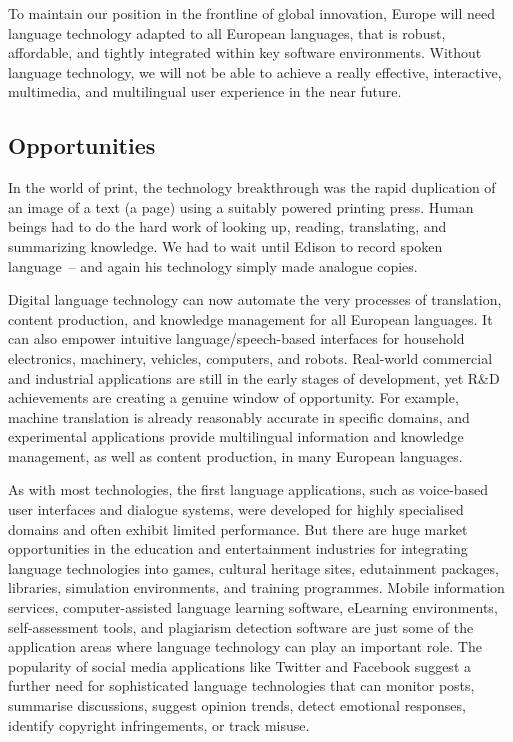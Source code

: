\begin{multicols}{2}
To maintain our position in the frontline of global innovation, Europe will need language technology adapted to all European languages, that is robust, affordable, and tightly integrated within key software environments.
 Without language technology, we will not be able to achieve a really effective, interactive, multimedia, and multilingual user experience in the near future. 

\subsection[Opportunities for Language Technology]{Opportunities}

In the world of print, the technology breakthrough was the rapid duplication of an image of a text (a page) using a suitably powered printing press. 
Human beings had to do the hard work of looking up, reading, translating, and summarizing knowledge. 
We had to wait until Edison to record spoken language~-- and again his technology simply made analogue copies.

Digital language technology can now automate the very processes of translation, content production, and knowledge management for all European languages. 
It can also empower intuitive language/speech-based interfaces for household electronics, machinery, vehicles, computers, and robots. 
Real-world commercial and industrial applications are still in the early stages of development, yet R\&D achievements are creating a genuine window of opportunity. 
For example, machine translation is already reasonably accurate in specific domains, and experimental applications provide multilingual information and knowledge management, as well as content production, in many European languages. 

As with most technologies, the first language applications, such as voice-based user interfaces and dialogue systems, were developed for highly specialised domains and often exhibit limited performance.  But there are huge market opportunities in the education and entertainment industries for integrating language technologies into games, cultural heritage sites, edutainment packages, libraries, simulation environments, and training programmes.  Mobile information services, computer-assisted language learning software, eLearning environments, self-assessment tools, and plagiarism detection software are just some of the application areas where language technology can play an important role.  The popularity of social media applications like Twitter and Facebook suggest a further need for sophisticated language technologies that can monitor posts, summarise discussions, suggest opinion trends, detect emotional responses, identify copyright infringements, or track misuse.


\end{multicols}
